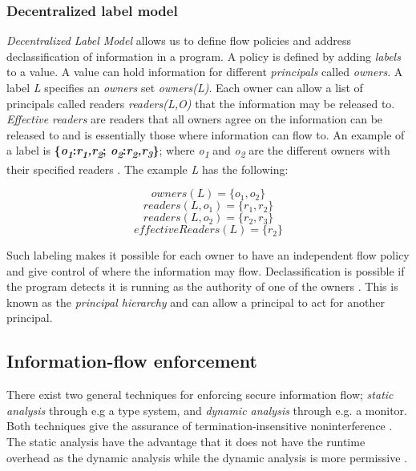 \subsubsection{Decentralized label model}\label{dlm}
\emph{Decentralized Label Model} allows us to define flow policies and address declassification of information in a program. A policy is defined by adding \emph{labels} to a value. A value can hold information for different \emph{principals} called \emph{owners}. A label \emph{L} specifies an \emph{owners} set \emph{owners(L)}. Each owner can allow a list of principals called readers \emph{readers(L,O)} that the information may be released to. \emph{Effective readers} are readers that all owners agree on the information can be released to and is essentially those where information can flow to. An example of a label is \textbf{\{\emph{o\textsubscript{1}}:\emph{r\textsubscript{1},r\textsubscript{2}}; \emph{o\textsubscript{2}}:\emph{r\textsubscript{2},r\textsubscript{3}}\}}; where  \emph{o\textsubscript{1}} and \emph{o\textsubscript{2}} are the different owners with their specified readers \cite{Myers1997}. The example \emph{L} has the following:

\[owners(L) = \{o_1, o_2\}\]
\[readers(L,o_1) = \{r_1, r_2\} \]
\[readers(L,o_2) = \{r_2, r_3\} \]
\[effectiveReaders(L) = \{r_2\} \]

Such labeling makes it possible for each owner to have an independent flow policy and give control of where the information may flow. Declassification is possible if the program detects it is running as the authority of one of the owners \cite{Myers1997} \cite{Myers1998}. This is known as the \emph{principal hierarchy} and can allow a principal to act for another principal.


\subsection{Information-flow enforcement}
There exist two general techniques for enforcing secure information flow; \emph{static analysis} through e.g a type system, and \emph{dynamic analysis} through e.g. a monitor. Both techniques give the assurance of termination-insensitive noninterference \cite{Sabelfeld2010}. The static analysis have the advantage that it does not have the runtime overhead as the dynamic analysis while the dynamic analysis is more permissive \cite{Sabelfeld2010}. 


